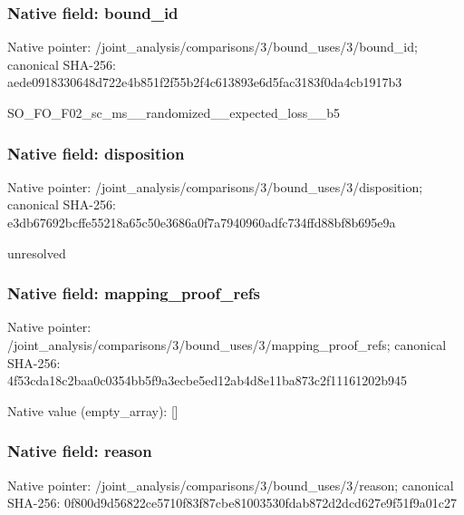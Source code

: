 \documentclass[10pt,a4paper]{article}
\begin{document}
\subsubsection{Native field: bound\_\allowbreak{}id}
Native pointer: /joint\_\allowbreak{}analysis/comparisons/3/bound\_\allowbreak{}uses/3/bound\_\allowbreak{}id; canonical SHA-256: aede0918330648d722e4b851f2f55b2f4c613893e6d5fac3183f0da4cb1917b3

\begingroup\raggedright\sloppy SO\_\allowbreak{}FO\_\allowbreak{}F02\_\allowbreak{}sc\_\allowbreak{}ms\_\allowbreak{}\_\allowbreak{}randomized\_\allowbreak{}\_\allowbreak{}expected\_\allowbreak{}loss\_\allowbreak{}\_\allowbreak{}b5\par\endgroup

\subsubsection{Native field: disposition}
Native pointer: /joint\_\allowbreak{}analysis/comparisons/3/bound\_\allowbreak{}uses/3/disposition; canonical SHA-256: e3db67692bcffe55218a65c50e3686a0f7a7940960adfc734ffd88bf8b695e9a

\begingroup\raggedright\sloppy unresolved\par\endgroup

\subsubsection{Native field: mapping\_\allowbreak{}proof\_\allowbreak{}refs}
Native pointer: /joint\_\allowbreak{}analysis/comparisons/3/bound\_\allowbreak{}uses/3/mapping\_\allowbreak{}proof\_\allowbreak{}refs; canonical SHA-256: 4f53cda18c2baa0c0354bb5f9a3ecbe5ed12ab4d8e11ba873c2f11161202b945

Native value (empty\_\allowbreak{}array): []

\subsubsection{Native field: reason}
Native pointer: /joint\_\allowbreak{}analysis/comparisons/3/bound\_\allowbreak{}uses/3/reason; canonical SHA-256: 0f800d9d56822ce5710f83f87cbe81003530fdab872d2dcd627e9f51f9a01c27
\end{document}
